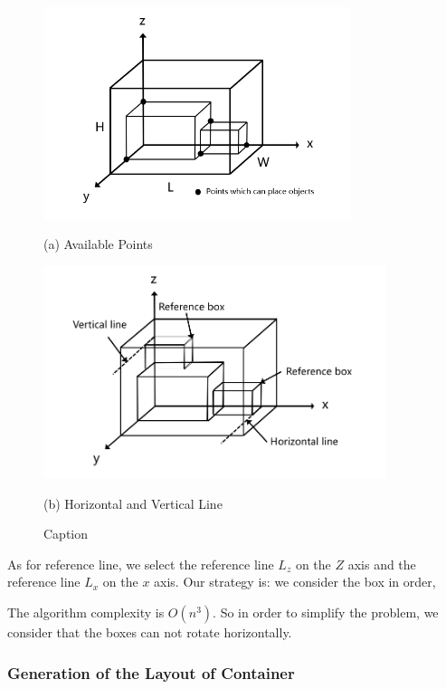 \documentclass{mcmthesis}
\begin{document}
\begin{figure}
    \begin{minipage}{0.48\linewidth}
    \centerline{\includegraphics[width=9.0cm]{figures/availablepoints.png}}
    \centerline{(a) Available Points}
    \end{minipage}
    \begin{minipage}{0.48\linewidth}
    \centerline{\includegraphics[width=10.0cm]{figures/hvline.png}}
    \centerline{(b) Horizontal and Vertical Line}
    \end{minipage}
    \caption{Caption}
    \label{Fig:packing}
\end{figure}

As for reference line, we select the reference line $L_z$ on the $Z$ axis and the reference line $L_x$ on the $x$ axis. Our strategy is: we consider the box in order,


The algorithm complexity is $O(n^3)$. So in order to simplify the problem, we consider that the boxes can not rotate horizontally.


\subsubsection{Generation of the Layout of Container}
\end{document}
